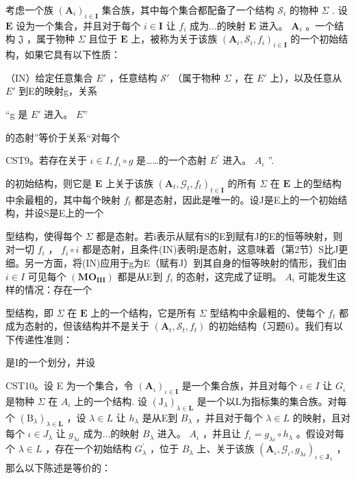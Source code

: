 考虑一个族 \((\mathbf{A}_i)_{i\in \mathbf{I}}\) 集合族，其中每个集合都配备了一个结构 \(\mathcal{S}_i\) 的物种 \(\Sigma\) . 设 \(\mathbf{E}\) 设为一个集合，并且对于每个 \(i\in \mathbf{I}\) 让 \(f_i\) 成为...的映射 \(\mathbf{E}\) 进入。 \(\mathbf{A}_i\) 。一个结构 \(\mathfrak{J}\) ，属于物种 \(\Sigma\) 且位于 \(\mathbf{E}\) 上，被称为关于该族 \((\mathbf{A}_i,\mathcal{S}_i,f_i)_{i\in \mathbf{I}}\) 的一个初始结构，如果它具有以下性质：

（IN）给定任意集合 \(E'\) ，任意结构 \(\mathcal{S}'\) （属于物种 \(\Sigma\) ，在 \(E'\) 上），以及任意从 \(E'\) 到E的映射g，关系

“g 是 \(E'\) 进入。 \(E\)''

的态射”等价于关系“对每个

CST9。若存在关于 \(\iota\in I,f_{\iota}\circ g\) 是……的一个态射 \(E^{\prime}\) 进入。 \(A_{\iota}\) ''.

的初始结构，则它是 \(\mathbf{E}\) 上关于该族 \((\mathbf{A}_t, \mathcal{G}_t, f_t)_{t \in \mathbf{I}}\) 的所有 \(\Sigma\) 在 \(\mathbf{E}\) 上的型结构中余最粗的，其中每个映射 \(f_t\) 都是态射，因此是唯一的。设J是E上的一个初始结构，并设S是E上的一个

型结构，使得每个 \(\Sigma\) 都是态射。若i表示从赋有S的E到赋有J的E的恒等映射，则对一切 \(f_{i}\) ， \(f_{i} \circ i\) 都是态射，且条件(IN)表明i是态射，这意味着（第2节）S比J更细。另一方面，将(IN)应用于g为E（赋有J）到其自身的恒等映射的情形，我们由 \(i \in I\) 可见每个 \((\mathbf{MO}_{\mathbf{III}})\) 都是从E到 \(f_{i}\) 的态射，这完成了证明。 \(A_{i}\) 可能发生这样的情况：存在一个

型结构，即 \(\Sigma\) 在 \(\mathbf{E}\) 上的一个结构，它是所有 \(\Sigma\) 型结构中余最粗的、使每个 \(f_{t}\) 都成为态射的，但该结构并不是关于 \((\mathbf{A}_{t},\mathcal{S}_{t},f_{t})\) 的初始结构（习题6）。我们有以下传递性准则：

是I的一个划分，并设

CST10。设 E 为一个集合，令 \((\mathbf{A}_{\iota})_{\iota\in\mathbf{I}}\) 是一个集合族，并且对每个 \(\iota\in I\) 让 \(G_{\iota}\) 是物种 \(\Sigma\) 在 \(A_{\iota}\) 上的一个结构. 设 \((\mathrm{J}_{\lambda})_{\lambda\in\mathbf{L}}\) 是一个以L为指标集的集合族。对每个 \((\mathrm{B}_{\lambda})_{\lambda\in\mathbf{L}}\) ，设 \(\lambda\in L\) 让 \(h_{\lambda}\) 是从E到 \(B_{\lambda}\) ，并且对于每个 \(\lambda\in L\) 的映射，且对每个 \(\iota\in J_{\lambda}\) 让 \(g_{\lambda\iota}\) 成为...的映射 \(B_{\lambda}\) 进入。 \(A_{\iota}\) ，并且让 \(f_{\iota}=g_{\lambda\iota}\circ h_{\lambda}\) 。假设对每个 \(\lambda\in L\) ，存在一个初始结构 \(G_{\lambda}^{\prime}\) ，位于 \(B_{\lambda}\) 上、关于该族 \((\mathbf{A}_{\iota},\mathcal{G}_{\iota},g_{\lambda\iota})_{\iota\in\mathbf{J}_{\lambda}}\) ，那么以下陈述是等价的：

